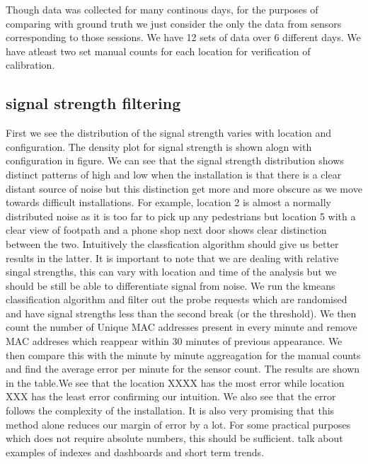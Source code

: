 Though data was collected for many continous days, for the purposes of comparing with ground truth we just consider the only the data from sensors corresponding to those sessions. We have 12 sets of data over 6 different days. We have atleast two set manual counts for each location for verification of calibration.

\subsection{signal strength filtering}
First we see the distribution of the signal strength varies with location and configuration. 
The density plot for signal strength is shown alogn with configuration in figure.
We can see that the signal strength distribution shows distinct patterns of high and low when the installation is that there is a clear distant source of noise but this distinction get more and more obscure as we move towards difficult installations. 
For example, location 2 is almost a normally distributed noise as it is too far to pick up any pedestrians but location 5 with a clear view of footpath and a phone shop next door shows clear distinction between the two. 
Intuitively the classfication algorithm should give us better results in the latter. 
It is important to note that we are dealing with relative singal strengths, this can vary with location and time of the analysis but we should be still be able to differentiate signal from noise. 
We run the kmeans classification algorithm and filter out the probe requests which are randomised and have signal strengths less than the second break (or the threshold). 
We then count the number of Unique MAC addresses present in every minute and remove MAC addreses which reappear within 30 minutes of previous appearance. 
We then compare this with the minute by minute aggreagation for the manual counts and find the average error per minute for the sensor count. 
The results are shown in the table.We see that the location XXXX has the most error while location XXX has the least error confirming our intuition. 
We also see that the error follows the complexity of the installation. 
It is also very promising that this method alone reduces our margin of error by a lot. 
For some practical purposes which does not require absolute numbers, this should be sufficient. talk about examples of indexes and dashboards and short term trends. 

